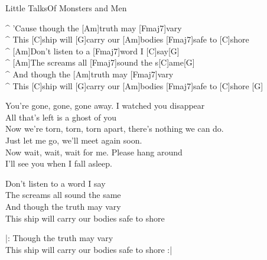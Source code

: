 \begin{song}{Little Talks}{Of Monsters and Men}
\begin{guitar}
^ 'Cause though the [Am]truth may [Fmaj7]vary\\
^ This [C]ship will [G]carry our [Am]bodies [Fmaj7]safe to [C]shore \\
^ [Am]Don't listen to a [Fmaj7]word I [C]say[G]\\
^ [Am]The screams all [Fmaj7]sound the s[C]ame[G]\\
^ And though the [Am]truth may [Fmaj7]vary\\
^ This [C]ship will [G]carry our [Am]bodies [Fmaj7]safe to [C]shore [G]\\
\end{guitar}


\begin{guitar}
You're gone, gone, gone away. I watched you disappear\\
All that's left is a ghost of you\\
Now we're torn, torn, torn apart, there's nothing we can do. \\
Just let me go, we'll meet again soon.\\
Now wait, wait, wait for me. Please hang around\\
I'll see you when I fall asleep.\\
\end{guitar}

\begin{guitar}
Don't listen to a word I say\\
The screams all sound the same\\
And though the truth may vary\\
This ship will carry our bodies safe to shore \\
\end{guitar}

\begin{guitar}
|: Though the truth may vary\\
This ship will carry our bodies safe to shore :|\\
\end{guitar}

\end{song}
